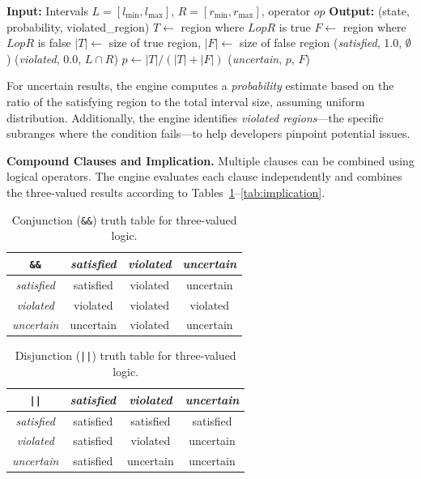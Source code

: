 \documentclass[pdflatex,sn-basic]{sn-jnl}%
\theoremstyle{thmstyleone}%
\theoremstyle{thmstyletwo}%
\theoremstyle{thmstylethree}%
\begin{document}
\begin{algorithm}[t]
\caption{Interval Comparison with Three-Valued Result}
\label{alg:interval-compare}
\begin{algorithmic}[1]
\State \textbf{Input:} Intervals $L = [l_{\min}, l_{\max}]$, $R = [r_{\min}, r_{\max}]$, operator $op$
\State \textbf{Output:} (state, probability, violated\_region)
\State $T \gets$ region where $L \mathrel{op} R$ is true
\State $F \gets$ region where $L \mathrel{op} R$ is false
\State $|T| \gets$ size of true region, $|F| \gets$ size of false region
    \State \Return (\textit{satisfied}, 1.0, $\emptyset$)
    \State \Return (\textit{violated}, 0.0, $L \cap R$)
\Else
    \State $p \gets |T| / (|T| + |F|)$ 
    \State \Return (\textit{uncertain}, $p$, $F$)
\EndIf
\end{algorithmic}
\end{algorithm}

For uncertain results, the engine computes a \textit{probability} estimate based on the ratio of the satisfying region to the total interval size, assuming uniform distribution.
Additionally, the engine identifies \textit{violated regions}---the specific subranges where the condition fails---to help developers pinpoint potential issues.

\smallskip
\noindent\textbf{Compound Clauses and Implication.}
Multiple clauses can be combined using logical operators.
The engine evaluates each clause independently and combines the three-valued results according to Tables~\ref{tab:conjunction}--\ref{tab:implication}.

\begin{table}[t]
\centering
\caption{Conjunction (\texttt{\&\&}) truth table for three-valued logic.}
\label{tab:conjunction}
\small
\begin{tabular}{c|ccc}
\toprule
\texttt{\&\&} & \textit{satisfied} & \textit{violated} & \textit{uncertain} \\
\midrule
\textit{satisfied} & satisfied & violated & uncertain \\
\textit{violated} & violated & violated & violated \\
\textit{uncertain} & uncertain & violated & uncertain \\
\bottomrule
\end{tabular}
\end{table}

\begin{table}[t]
\centering
\caption{Disjunction (\texttt{||}) truth table for three-valued logic.}
\label{tab:disjunction}
\small
\begin{tabular}{c|ccc}
\toprule
\texttt{||} & \textit{satisfied} & \textit{violated} & \textit{uncertain} \\
\midrule
\textit{satisfied} & satisfied & satisfied & satisfied \\
\textit{violated} & satisfied & violated & uncertain \\
\textit{uncertain} & satisfied & uncertain & uncertain \\
\bottomrule
\end{tabular}
\end{table}
\end{document}
